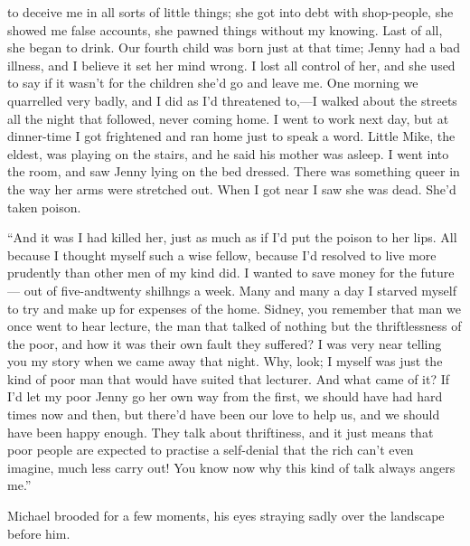 to deceive me in all sorts of little things; she got into debt with
shop-people, she showed {\protect\hypertarget{134}{}{}}me false
accounts, she pawned things without my knowing. Last of all, she began
to drink. Our fourth child was born just at that time; Jenny had a bad
illness, and I believe it set her mind wrong. I lost all control of her,
and she used to say if it wasn't for the children she'd go and leave me.
One morning we quarrelled very badly, and I did as I'd threatened
to,---I walked about the streets all the night that followed, never
coming home. I went to work next day, but at dinner-time I got
frightened and ran home just to speak a word. Little Mike, the eldest,
was playing on the stairs, and he said his mother was asleep. I went
into the room, and saw Jenny lying on the bed dressed. There was
something queer in the way her arms were stretched out. When I got near
I saw she was dead. She'd taken poison.

``And it was I had killed her, just as much as if I'd put the poison to
her lips. All because I thought myself such a wise fellow, because I'd
resolved to live more prudently {\protect\hypertarget{135}{}{}}than
other men of my kind did. I wanted to save money for the future--- out
of five-andtwenty shilhngs a week. Many and many a day I starved myself
to try and make up for expenses of the home. Sidney, you remember that
man we once went to hear lecture, the man that talked of nothing but the
thriftlessness of the poor, and how it was their own fault they
suffered? I was very near telling you my story when we came away that
night. Why, look; I myself was just the kind of poor man that would have
suited that lecturer. And what came of it? If I'd let my poor Jenny go
her own way from the first, we should have had hard times now and then,
but there'd have been our love to help us, and we should have been happy
enough. They talk about thriftiness, and it just means that poor people
are expected to practise a self-denial that the rich can't even imagine,
much less carry out! You know now why this kind of talk always angers
me.''

Michael brooded for a few moments, his eyes straying sadly over the
landscape before him.

